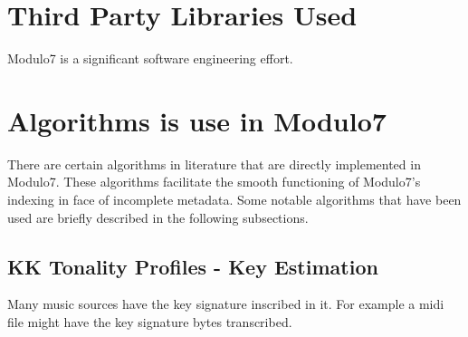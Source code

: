 \appendix
{}
\chapter{Third Party Libraries Used}

\noindent Modulo7 is a significant software engineering effort.

\chapter{Algorithms is use in Modulo7}

\noindent There are certain algorithms in literature that are directly implemented in Modulo7. These algorithms facilitate the smooth functioning of Modulo7's indexing in face of incomplete metadata. Some notable algorithms that have been used are briefly described in the following subsections. 

\section{KK Tonality Profiles - Key Estimation}

\noindent Many music sources have the key signature inscribed in it. For example a midi file might have the key signature bytes transcribed. 
